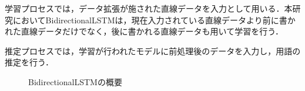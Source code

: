 学習プロセスでは，データ拡張が施された直線データを入力として用いる．本研究においてBidirectionalLSTMは，現在入力されている直線データより前に書かれた直線データだけでなく，後に書かれる直線データも用いて学習を行う．

推定プロセスでは，学習が行われたモデルに前処理後のデータを入力し，用語の推定を行う．

\begin{figure}[tb]
 \begin{center}
  \caption{BidirectionalLSTMの概要}
  \label{blstm}
\end{center}
\end{figure}

